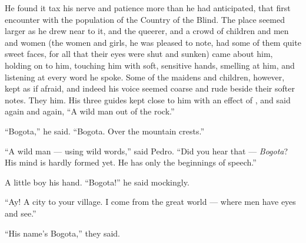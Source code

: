 \documentclass{fiche}
\begin{document}
\begin{version}
He found it tax his nerve and patience more than he had anticipated, that first encounter with
the population of the Country of the Blind. The place seemed larger as he drew near to it, and
the   queerer,
and a crowd of children and men and women (the women and girls, he was pleased to note, had
some of them quite sweet faces, for all that their eyes were shut and sunken) came about him,
holding on to him, touching him with soft, sensitive hands, smelling at him, and listening at
every word he spoke. Some of the maidens and children, however, kept
 as if afraid, and indeed his voice seemed coarse and rude beside
their softer notes. They  him. His three guides kept
close to him with an effect of ,
and said again and again, ``A wild man out of the rock.''

``Bogota,'' he said. ``Bogota. Over the mountain crests.''

``A wild man --- using wild words,'' said Pedro. ``Did you hear that --- \emph{Bogota}? His
mind is hardly formed yet. He has only the beginnings of speech.''

A little boy  his hand. ``Bogota!'' he said mockingly.

``Ay! A city to your village. I come from the great world --- where men have eyes and see.''

``His name's Bogota,'' they said.
\end{version}

\end{document}

